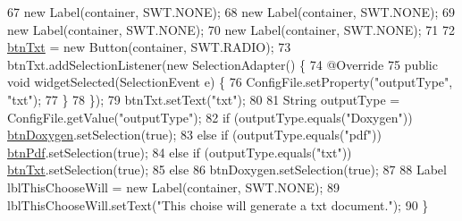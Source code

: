 \begin{DoxyCode}
67         \textcolor{keyword}{new} Label(container, SWT.NONE);
68         \textcolor{keyword}{new} Label(container, SWT.NONE);
69         \textcolor{keyword}{new} Label(container, SWT.NONE);
70         \textcolor{keyword}{new} Label(container, SWT.NONE);
71         
72         \hyperlink{classit_1_1isislab_1_1masonhelperdocumentation_1_1mason_1_1wizards_1_1_a1___choose_output_a4332e3cc38ddfd02242b707d92333cd3}{btnTxt} = \textcolor{keyword}{new} Button(container, SWT.RADIO);
73         btnTxt.addSelectionListener(\textcolor{keyword}{new} SelectionAdapter() \{
74             @Override
75             \textcolor{keyword}{public} \textcolor{keywordtype}{void} widgetSelected(SelectionEvent e) \{
76                 ConfigFile.setProperty(\textcolor{stringliteral}{"outputType"}, \textcolor{stringliteral}{"txt"});
77             \}
78         \});
79         btnTxt.setText(\textcolor{stringliteral}{"txt"});
80         
81         String outputType = ConfigFile.getValue(\textcolor{stringliteral}{"outputType"});
82         \textcolor{keywordflow}{if} (outputType.equals(\textcolor{stringliteral}{"Doxygen"}))   \hyperlink{classit_1_1isislab_1_1masonhelperdocumentation_1_1mason_1_1wizards_1_1_a1___choose_output_ac2ea8ed088a188d85870e9afb90b8f88}{btnDoxygen}.setSelection(\textcolor{keyword}{true});
83         \textcolor{keywordflow}{else} \textcolor{keywordflow}{if} (outputType.equals(\textcolor{stringliteral}{"pdf"}))  \hyperlink{classit_1_1isislab_1_1masonhelperdocumentation_1_1mason_1_1wizards_1_1_a1___choose_output_ae7d5e743ab4af65fec8563ca08ed561c}{btnPdf}.setSelection(\textcolor{keyword}{true});
84         \textcolor{keywordflow}{else} \textcolor{keywordflow}{if} (outputType.equals(\textcolor{stringliteral}{"txt"}))  \hyperlink{classit_1_1isislab_1_1masonhelperdocumentation_1_1mason_1_1wizards_1_1_a1___choose_output_a4332e3cc38ddfd02242b707d92333cd3}{btnTxt}.setSelection(\textcolor{keyword}{true});
85         \textcolor{keywordflow}{else}
86             btnDoxygen.setSelection(\textcolor{keyword}{true});
87         
88         Label lblThisChooseWill = \textcolor{keyword}{new} Label(container, SWT.NONE);
89         lblThisChooseWill.setText(\textcolor{stringliteral}{"This choise will generate a txt document."});
90     \}
\end{DoxyCode}
